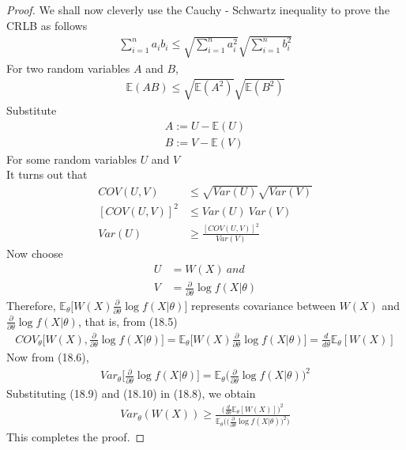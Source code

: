 \documentclass[12pt]{report}
\begin{document}
\begin{proof}
We shall now cleverly use the Cauchy - Schwartz inequality to prove the CRLB as follows
\begin{align*}
\sum_{i=1}^{n} a_i b_i \leq \sqrt{\sum_{i=1}^{n} a_i^2}\sqrt{\sum_{i=1}^{n} b_i^2}
\end{align*}
For two random variables $A$ and $B$,
\begin{align*}
\mathbb{E}(AB) \leq \sqrt{\mathbb{E}(A^2)}\sqrt{\mathbb{E}(B^2)}
\end{align*} 
Substitute 
\begin{align*}
A := U - \mathbb{E}(U)\\
B := V - \mathbb{E}(V)
\end{align*}
For some random variables $U$ and $V$\\
It turns out that 
\begin{align}
COV(U,V) & \leq \sqrt{Var(U)} \sqrt{Var(V)} \nonumber \\
[COV(U,V)]^2 & \leq Var(U) \  Var(V) \nonumber\\
Var(U) & \geq \frac{[COV(U,V)]^2}{Var(V)}
\end{align}
Now choose 
\begin{align*}
U &= W(X) \  and\\
V &= \frac{\partial}{\partial \theta} \log f(X | \theta)
\end{align*}
Therefore,
$\mathbb{E}_\theta \Big[ W(X) \frac{\partial}{\partial \theta}\log f(X | \theta) \Big]$ represents covariance between $W(X)$ and $\frac{\partial}{\partial \theta}\log f(X | \theta)$, that is, from (18.5)
\begin{align}
COV_\theta \Big[ W(X), \frac{\partial}{\partial \theta}\log f(X | \theta) \Big] = \mathbb{E}_\theta \Big[ W(X) \frac{\partial}{\partial \theta}\log f(X | \theta) \Big] = \frac{d}{d\theta}\mathbb{E}_\theta[W(X)]
\end{align}
Now from (18.6),
\begin{align}
Var_\theta \Big[\frac{\partial}{\partial \theta}\log f(X | \theta) \Big] = \mathbb{E}_\theta \Big(\frac{\partial}{\partial \theta}\log f(X | \theta) \Big)^2
\end{align}
Substituting  (18.9) and (18.10) in (18.8), we obtain
\begin{align*}
Var_\theta(W(X)) \geq \frac{\Big(\frac{d}{d\theta}\mathbb{E}_\theta[W(X)] \Big)^2}{\mathbb{E}_\theta \Big(\big(\frac{\partial}{\partial \theta} \log f(X | \theta)\big)^2\Big)}
\end{align*}
This completes the proof.
\end{proof}
   
\end{document}
